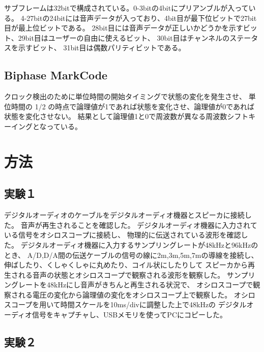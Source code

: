 \documentclass[11pt,a4j]{jsarticle}
\begin{document}
サブフレームは32bitで構成されている。0-3bitの4bitにプリアンブルが入っている。
4-27bitの24bitには音声データが入っており、4bit目が最下位ビットで27bit目が最上位ビットである。
28bit目には音声データが正しいかどうかを示すビット、29bit目はユーザーの自由に使えるビット、
30bit目はチャンネルのステータスを示すビット、 31bit目は偶数パリティビットである。





\subsection{Biphase MarkCode}
\label{sub:Biphase MarkCode}

クロック検出のために単位時間の開始タイミングで状態の変化を発生させ、
単位時間の 1/2 の時点で論理値が1であれば状態を変化させ、論理値が0であれば状態を変化させない。
結果として論理値1と0で周波数が異なる周波数シフトキーイングとなっている。

\section{方法}
\label{sec:方法}

\subsection{実験１}
\label{sub:実験１}

デジタルオーディオのケーブルをデジタルオーディオ機器とスピーカに接続した。
音声が再生されることを確認した。
デジタルオーディオ機器に入力されている信号をオシロスコープに接続し、
物理的に伝送されている波形を確認した。
デジタルオーディオ機器に入力するサンプリングレートが48kHzと96kHzのとき、
A/D,D/A間の伝送ケーブルの信号の線に2m,3m,5m,7mの導線を接続し、
伸ばしたり、くしゃくしゃに丸めたり、コイル状にしたりして
スピーカから再生される音声の状態とオシロスコープで観察される波形を観察した。
サンプリングレートを48kHzにし音声がきちんと再生される状況で、
オシロスコープで観察される電圧の変化から論理値の変化をオシロスコープ上で観察した。
オシロスコープを用いて時間スケールを10ms/divに調整した上で48kHzの
デジタルオーディオ信号をキャプチャし、USBメモリを使ってPCにコピーした。

\subsection{実験２}
\label{sub:実験２}
\end{document}
